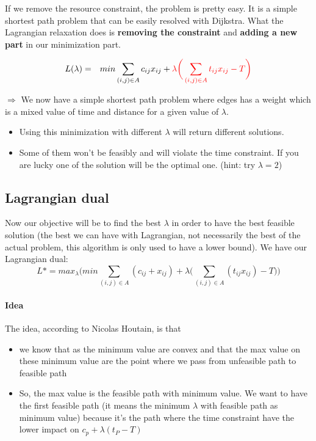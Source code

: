If we remove the resource constraint, the problem is pretty easy. It is
a simple shortest path problem that can be easily resolved with
Dijkstra. What the Lagrangian relaxation does is \textbf{removing the
constraint} and \textbf{adding a new part} in our minimization part.

\begin{eqnarray*}
    L(\lambda) &=& min \sum_{(i,j)\in A} c_{ij} x_{ij} + 
    \textcolor{red}{\lambda \bigg(\sum_{(i,j)\in A} t_{ij} x_{ij} - T
    \bigg)} \\
\end{eqnarray*}

$\Rightarrow$ We now have a simple shortest path problem 
where edges has a weight which is a
mixed value of time and distance for a given value of $\lambda$. 

\begin{itemize}
    \item Using this minimization with different $\lambda$ will return
        different solutions. 

    \item Some of them won't be feasibly and will violate the time
        constraint. If you are lucky one of the solution will be the
        optimal one. (hint: try $\lambda = 2$)
\end{itemize}

\subsection{Lagrangian dual}
Now our objective will be to find the best $\lambda$ in order to have
the best feasible solution (the best we can have with Lagrangian, not
necessarily the best of the actual problem, this algorithm is only used
to have a lower bound). We have our Lagrangian dual: 
$$L* = max_{\lambda} \Bigg( min \sum_{(i,j)\in A} (c_{ij} + x_{ij}) +
\lambda \big(\sum_{(i,j)\in A} (t_{ij} x_{ij}) - T\big) \Bigg)$$

\paragraph{Idea}
The idea, according to Nicolas Houtain, is that 
\begin{itemize} 
    \item we know that as the minimum value are convex and that the max
        value on these minimum value are the point where we pass from 
        unfeasible path to feasible path

    \item So, the max value is the feasible path with minimum value. We
        want to have the first feasible path (it means the minimum
        $\lambda$ with feasible path as minimum value) because it's the
        path where the time constraint have the lower impact on $c_p +
        \lambda (t_P -T)$
\end{itemize}

